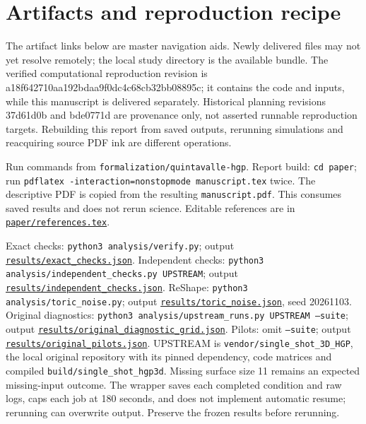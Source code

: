 \documentclass[11pt]{article}
\begin{document}
\section{Artifacts and reproduction recipe}
The artifact links below are master navigation aids. Newly delivered files may not yet resolve remotely; the local study directory is the available bundle. The verified computational reproduction revision is a18f642710aa192bdaa9f0dc4c68cb32bb08895c; it contains the code and inputs, while this manuscript is delivered separately. Historical planning revisions 37d61d0b and bde0771d are provenance only, not asserted runnable reproduction targets. Rebuilding this report from saved outputs, rerunning simulations and reacquiring source PDF ink are different operations.

Run commands from \texttt{formalization/quintavalle-hgp}. Report build: \texttt{cd paper}; run \texttt{pdflatex -interaction=nonstopmode manuscript.tex} twice. The descriptive PDF is copied from the resulting \texttt{manuscript.pdf}. This consumes saved results and does not rerun science. Editable references are in \href{https://github.com/alectionary/vibe-math/blob/master/formalization/quintavalle-hgp/paper/references.tex}{\nolinkurl{paper/references.tex}}.

Exact checks: \texttt{python3 analysis/verify.py}; output \href{https://github.com/alectionary/vibe-math/blob/master/formalization/quintavalle-hgp/results/exact_checks.json}{\nolinkurl{results/exact_checks.json}}. Independent checks: \texttt{python3 analysis/independent\_checks.py UPSTREAM}; output \href{https://github.com/alectionary/vibe-math/blob/master/formalization/quintavalle-hgp/results/independent_checks.json}{\nolinkurl{results/independent_checks.json}}. ReShape: \texttt{python3 analysis/toric\_noise.py}; output \href{https://github.com/alectionary/vibe-math/blob/master/formalization/quintavalle-hgp/results/toric_noise.json}{\nolinkurl{results/toric_noise.json}}, seed 20261103. Original diagnostics: \texttt{python3 analysis/upstream\_runs.py UPSTREAM --suite}; output \href{https://github.com/alectionary/vibe-math/blob/master/formalization/quintavalle-hgp/results/original_diagnostic_grid.json}{\nolinkurl{results/original_diagnostic_grid.json}}. Pilots: omit \texttt{--suite}; output \href{https://github.com/alectionary/vibe-math/blob/master/formalization/quintavalle-hgp/results/original_pilots.json}{\nolinkurl{results/original_pilots.json}}. UPSTREAM is \texttt{vendor/single\_shot\_3D\_HGP}, the local original repository with its pinned dependency, code matrices and compiled \texttt{build/single\_shot\_hgp3d}. Missing surface size 11 remains an expected missing-input outcome. The wrapper saves each completed condition and raw logs, caps each job at 180 seconds, and does not implement automatic resume; rerunning can overwrite output. Preserve the frozen results before rerunning.
\end{document}
